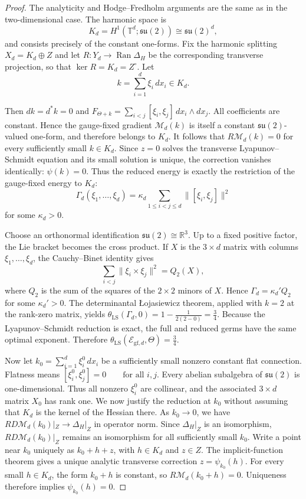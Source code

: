 \documentclass[11pt]{article}
\theoremstyle{definition}
\theoremstyle{remark}
\begin{document}
\begin{proof} The analyticity and Hodge–Fredholm arguments are the same as in the two-dimensional case. The harmonic space is
$$K_d=H^1(\mathbb T^d;\mathfrak{su}(2))\cong\mathfrak{su}(2)^d,$$
and consists precisely of the constant one-forms. Fix the harmonic splitting
$X_d=K_d\oplus Z$
and let $R:Y_d\to\operatorname{Ran}\Delta_H$ be the corresponding transverse projection, so that $\ker R=K_d=Z^\circ$.
Let
$$k=\sum_{i=1}^d\xi_i\,dx_i\in K_d.$$

Then $dk=d^*k=0$ and $F_{\Theta+k}=\sum_{i<j}[\xi_i,\xi_j]\,dx_i\wedge dx_j$.
All coefficients are constant. Hence the gauge-fixed gradient $\mathcal M_d(k)$ is itself a constant $\mathfrak{su}(2)$-valued one-form, and therefore belongs to $K_d$. 
It follows that $R\mathcal M_d(k)=0$
for every sufficiently small $k\in K_d$. Since $z=0$ solves the transverse Lyapunov–Schmidt equation and its small solution is unique, the correction vanishes identically:
$\psi(k)=0$. Thus the reduced energy is exactly the restriction of the gauge-fixed energy to $K_d$:
$$ \Gamma_d(\xi_1,\ldots,\xi_d)  =\kappa_d\sum_{1\le i<j\le d}\|[\xi_i,\xi_j]\|^2 $$
for some $\kappa_d>0$.

\smallskip
Choose an orthonormal identification $\mathfrak{su}(2)\cong\mathbb R^3$. Up to a fixed positive factor, the Lie bracket becomes the cross product. If $X$ is the $3\times d$ matrix with columns $\xi_1,\ldots,\xi_d$, the Cauchy–Binet identity gives
$$\sum_{i<j}\|\xi_i\times\xi_j\|^2=Q_2(X),$$
where $Q_2$ is the sum of the squares of the $2\times2$ minors of $X$. Hence
$\Gamma_d=\kappa_d'Q_2$
for some $\kappa_d'>0$. The determinantal Łojasiewicz theorem, applied with $k=2$ at the rank-zero matrix, yields
$\theta_{\mathrm{LS}}(\Gamma_d,0)=1-\frac{1}{2(2-0)}=\frac34$.
Because the Lyapunov–Schmidt reduction is exact, the full and reduced germs have the same optimal exponent. Therefore
$\theta_{\mathrm{LS}}(\mathcal E_{\mathrm{gf},d},\Theta)=\frac34$.

\smallskip
Now let $k_0=\sum_{i=1}^d\xi_i^0\,dx_i$ 
be a sufficiently small nonzero constant flat connection. Flatness means
$[\xi_i^0,\xi_j^0]=0\qquad\text{for all }i,j$.
Every abelian subalgebra of $\mathfrak{su}(2)$ is one-dimensional. Thus all nonzero $\xi_i^0$ are collinear, and the associated $3\times d$ matrix $X_0$ has rank one.
We now justify the reduction at $k_0$ without assuming that $K_d$ is the kernel of the Hessian there. As $k_0\to0$, we have
$R D\mathcal M_d(k_0)|_Z\longrightarrow\Delta_H|_Z$
in operator norm. Since $\Delta_H|_Z$ is an isomorphism, $R D\mathcal M_d(k_0)|_Z$ remains an isomorphism for all sufficiently small $k_0$.
Write a point near $k_0$ uniquely as $k_0+h+z$, with $h\in K_d$ and $z\in Z$. The implicit-function theorem gives a unique analytic transverse correction $z=\psi_{k_0}(h)$. For every small $h\in K_d$, the form $k_0+h$ is constant, so
$R\mathcal M_d(k_0+h)=0$. Uniqueness therefore implies $\psi_{k_0}(h)=0$. 


\end{proof}
\end{document}
